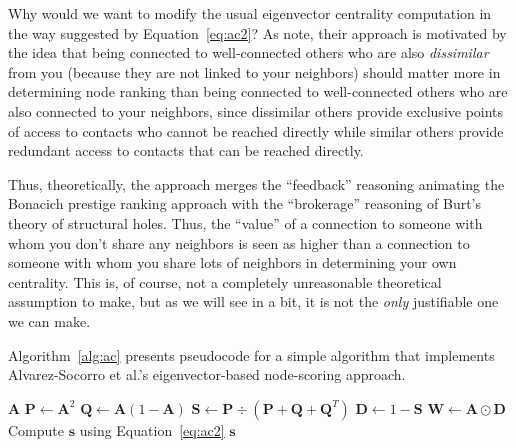 \documentclass[12pt]{article}
\begin{document}
Why would we want to modify the usual eigenvector centrality computation in the way suggested by Equation~\ref{eq:ac2}? As \citet{alvarez-socorro2015eigencentrality-66c} note, their approach is motivated by the idea that being connected to well-connected others who are also \textit{dissimilar} from you (because they are not linked to your neighbors) should matter more in determining node ranking than being connected to well-connected others who are also connected to your neighbors, since dissimilar others provide exclusive points of access to contacts who cannot be reached directly while similar others provide redundant access to contacts that can be reached directly. 

Thus, theoretically, the \citet{alvarez-socorro2015eigencentrality-66c} approach merges the ``feedback'' reasoning animating the Bonacich prestige ranking approach with the ``brokerage'' reasoning of Burt's \citeyearpar{burt1995structural-5e8} theory of structural holes. Thus, the ``value'' of a connection to someone with whom you don't share any neighbors is seen as higher than a connection to someone with whom you share lots of neighbors in determining your own centrality. This is, of course, not a completely unreasonable theoretical assumption to make, but as we will see in a bit, it is not the \textit{only} justifiable one we can make. 

Algorithm~\ref{alg:ac} presents pseudocode for a simple algorithm that implements Alvarez-Socorro et al.'s eigenvector-based node-scoring approach.

\begin{algorithm}[ht!]
\caption{Alvarez-Socorro et al.'s \citeyearpar{alvarez-socorro2015eigencentrality-66c} Dissimilarity Scoring}
\label{alg:ac}
\begin{algorithmic}[1]
\Require $\mathbf{A}$ 
\State $\mathbf{P} \gets \mathbf{A}^2$ 
\State $\mathbf{Q} \gets \mathbf{A}(1-\mathbf{A})$ 
\State $\mathbf{S} \gets \mathbf{P} \div \left(\mathbf{P}+\mathbf{Q}+\mathbf{Q}^T\right)$ 
\State $\mathbf{D} \gets 1-\mathbf{S}$ 
\State $\mathbf{W} \gets \mathbf{A} \odot \mathbf{D}$ 
\State Compute $\mathbf{s}$ using Equation~\ref{eq:ac2} 
\State \Return $\mathbf{s}$ 
\end{algorithmic}
\end{algorithm}
\end{document}
